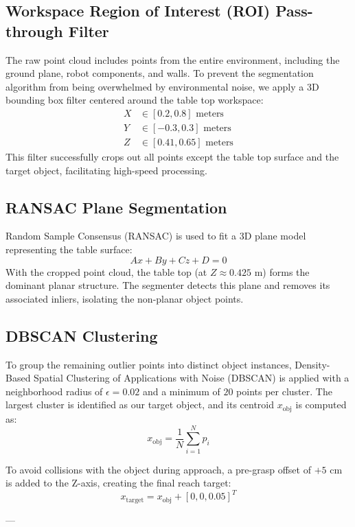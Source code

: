 \documentclass[12pt, a4paper]{article}
\begin{document}
\subsection{Workspace Region of Interest (ROI) Pass-through Filter}
The raw point cloud includes points from the entire environment, including the ground plane, robot components, and walls. To prevent the segmentation algorithm from being overwhelmed by environmental noise, we apply a 3D bounding box filter centered around the table top workspace:
\begin{align*}
X &\in [0.2, 0.8] \text{ meters} \\
Y &\in [-0.3, 0.3] \text{ meters} \\
Z &\in [0.41, 0.65] \text{ meters}
\end{align*}
This filter successfully crops out all points except the table top surface and the target object, facilitating high-speed processing.

\subsection{RANSAC Plane Segmentation}
Random Sample Consensus (RANSAC) is used to fit a 3D plane model representing the table surface:
$$A x + B y + C z + D = 0$$
With the cropped point cloud, the table top (at $Z \approx 0.425$ m) forms the dominant planar structure. The segmenter detects this plane and removes its associated inliers, isolating the non-planar object points.

\subsection{DBSCAN Clustering}
To group the remaining outlier points into distinct object instances, Density-Based Spatial Clustering of Applications with Noise (DBSCAN) is applied with a neighborhood radius of $\epsilon = 0.02$ and a minimum of $20$ points per cluster. The largest cluster is identified as our target object, and its centroid $x_{\text{obj}}$ is computed as:
$$x_{\text{obj}} = \frac{1}{N} \sum_{i=1}^{N} p_i$$

To avoid collisions with the object during approach, a pre-grasp offset of $+5$ cm is added to the Z-axis, creating the final reach target:
$$x_{\text{target}} = x_{\text{obj}} + [0, 0, 0.05]^T$$

---

\end{document}
